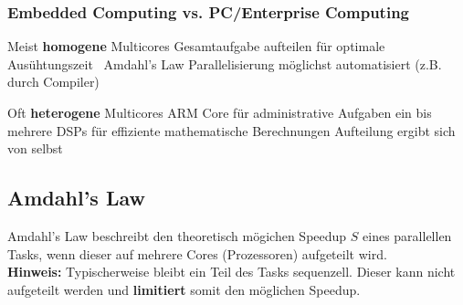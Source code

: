 \subsubsection{Embedded Computing vs. PC/Enterprise Computing}



\begin{outline}
    \1 Meist \textbf{homogene} Multicores
        \2 Gesamtaufgabe aufteilen für optimale Ausühtungszeit \textrightarrow\ Amdahl's Law
    \1 Parallelisierung möglichst automatisiert (z.B. durch Compiler)
\end{outline}


\begin{outline}
    \1 Oft \textbf{heterogene} Multicores
        \2 ARM Core für administrative Aufgaben
        \2 ein bis mehrere DSPs für effiziente mathematische Berechnungen
        \2 Aufteilung ergibt sich von selbst
\end{outline}


\subsection{Amdahl's Law}

Amdahl's Law beschreibt den theoretisch mögichen Speedup $S$ eines parallellen Tasks, wenn dieser
auf mehrere Cores (Prozessoren) aufgeteilt wird. \\
\textbf{Hinweis:} Typischerweise bleibt ein Teil des Tasks sequenzell. Dieser kann nicht aufgeteilt werden
und \textbf{limitiert} somit den möglichen Speedup.

\vspace{0.1cm}

        

